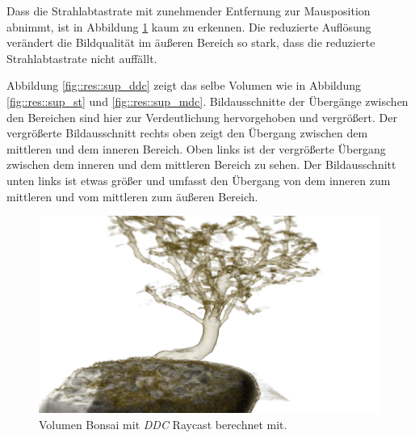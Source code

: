 Dass die Strahlabtastrate mit zunehmender Entfernung zur Mausposition abnimmt, ist in Abbildung \ref{fig::res::bon_ddc} kaum zu erkennen.
Die reduzierte Auflösung verändert die Bildqualität im äußeren Bereich so stark, dass die reduzierte Strahlabtastrate nicht auffällt.

Abbildung \ref{fig::res::sup_ddc} zeigt das selbe Volumen wie in Abbildung \ref{fig::res::sup_st} und \ref{fig::res::sup_mdc}.
Bildausschnitte der Übergänge zwischen den Bereichen sind hier zur Verdeutlichung hervorgehoben und vergrößert.
Der vergrößerte Bildausschnitt rechts oben zeigt den Übergang zwischen dem mittleren und dem inneren Bereich.
Oben links ist der vergrößerte Übergang zwischen dem inneren und dem mittleren Bereich zu sehen.
Der Bildausschnitt unten links ist etwas größer und umfasst den Übergang von dem inneren zum mittleren und vom mittleren zum äußeren Bereich.

\begin{landscape}
	\begin{figure}
		\centering
		\includegraphics[width=1\textheight]{../../Grafiken/results/picture_quality/bonsai/DDC_img-1_ray-1-5.png}
		\caption{Volumen Bonsai mit \emph{DDC} Raycast berechnet mit.}
		\label{fig::res::bon_ddc}
	\end{figure}
\end{landscape}

